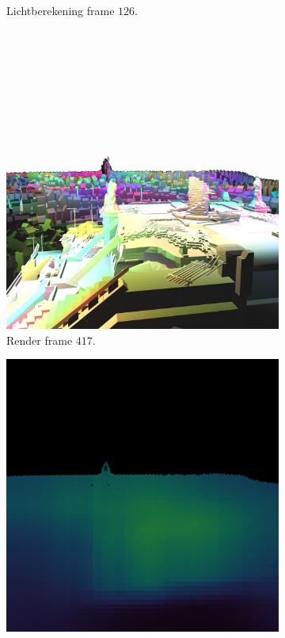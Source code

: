 \begin{figure}[t]
\begin{subfigure}[b]{0.35\textwidth}
    \caption{Lichtberekening frame $126$.}
    \vspace{2pt}
    \label{fig:ts-test-frames-example:pa:126lc}
  \end{subfigure}\\
  \begin{subfigure}[b]{0.35\textwidth}
    \includegraphics[width=\textwidth]{./img/raw/lc-frame-example/render/zc_frame_417.png}
    \caption{Render frame $417$.}
    \label{fig:ts-test-frames-example:zc:417render}
  \end{subfigure}\quad %
  \begin{subfigure}[b]{0.35\textwidth}
    \includegraphics[width=\textwidth]{./img/raw/lc-frame-example/ts/zc_frame_417.png}

\end{subfigure}
\end{figure}
